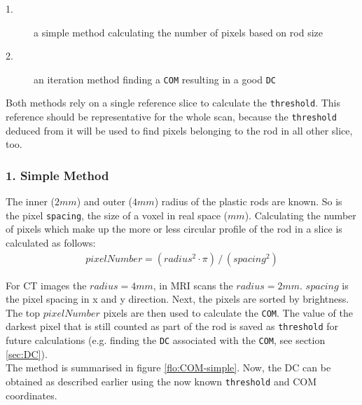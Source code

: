 \begin{description}
 \item[1.] a simple method calculating the number of pixels based on rod size
 \item[2.] an iteration method finding a \texttt{COM} resulting in a good \texttt{DC}
\end{description}

Both methods rely on a single reference slice to calculate the  \texttt{threshold}.
This reference should be representative for the whole scan, because the  \texttt{threshold} deduced from it will be used to find pixels belonging to the rod in all other slice, too.

\subsubsection{1. Simple Method}
The inner ($2mm$) and outer ($4mm$) radius of the plastic rods are known.
So is the pixel \texttt{spacing}, the size of a voxel in real space ($mm$).
Calculating the number of pixels which make up the more or less circular profile of the rod in a slice is calculated as follows:
\begin{align}
 pixelNumber = (radius^2 \cdot \pi) \, / \, (spacing^2)
\end{align}

For CT images the $radius = 4mm$, in MRI scans the $radius = 2mm$. $spacing$ is the pixel spacing in x and y direction.
Next, the pixels are sorted by brightness. The top $pixelNumber$ pixels are then used to calculate the \texttt{COM}.
The value of the darkest pixel that is still counted as part of the rod is saved as  \texttt{threshold} for future calculations (e.g. finding the \texttt{DC} associated with the \texttt{COM}, see section \ref{sec:DC}).\\
The method is summarised in figure \ref{flo:COM-simple}.
Now, the DC can be obtained as described earlier using the now known \texttt{threshold} and COM coordinates.

